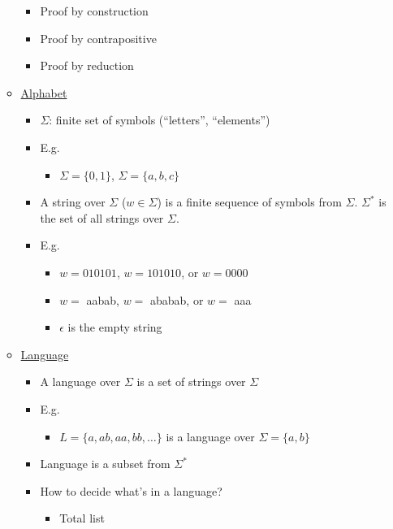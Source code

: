 \documentclass[12pt]{article}
\begin{document}
\begin{enumerate}
\begin{itemize}
\begin{itemize}
                \item Proof by construction
                \item Proof by contrapositive
                \item Proof by reduction
            \end{itemize}
            \item \underline{Alphabet}
            \begin{itemize}
                \item $\Sigma$: finite set of symbols (``letters'', ``elements'')
                \item E.g.
                \begin{itemize}
                    \item $\Sigma = \{0, 1\}$, $\Sigma = \{a, b, c\}$
                \end{itemize}
                \item A string over $\Sigma$ ($w \in \Sigma$) is a finite sequence of symbols from $\Sigma$. $\Sigma^*$ is the set of all strings over $\Sigma$.
                \item E.g.
                \begin{itemize}
                    \item $w = 010101$, $w = 101010$, or $w = 0000$
                    \item $w =$ aabab, $w =$ ababab, or $w =$ aaa
                    \item $\epsilon$ is the empty string
                \end{itemize}
            \end{itemize}
            \item \underline{Language}
            \begin{itemize}
                \item A language over $\Sigma$ is a set of strings over $\Sigma$
                \item E.g.
                \begin{itemize}
                    \item $L = \{a, ab, aa, bb, \ldots\}$ is a language over $\Sigma = \{a, b\}$
                \end{itemize}
                \item Language is a subset from $\Sigma^*$
                \item How to decide what's in a language?
                \begin{itemize}
                    \item Total list

\end{itemize}
\end{itemize}
\end{itemize}
\end{enumerate}
\end{document}
